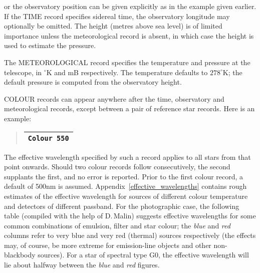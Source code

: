 \documentclass[twoside,11pt]{article}
\renewcommand{\_}{\texttt{\symbol{95}}}
\begin{document}
or the observatory position can be given explicitly as in the example
given earlier.  If the TIME record specifies sidereal time, the
observatory longitude may optionally be omitted.  The height (metres above
sea level) is of limited importance unless the meteorological record is
absent, in which case the height is used to estimate the pressure.

The METEOROLOGICAL record specifies the temperature and pressure at the
telescope, in $^\circ$K and mB respectively.  The temperature defaults
to $278^\circ$K; the default pressure is computed from the observatory
height.

COLOUR records can appear anywhere after the time, observatory and
meteorological records, except between a pair of reference star records.
Here is an example:

\begin{quote}
\begin{tabular}{|l|}
\hline
\verb|Colour 550| \\
\hline
\end{tabular}
\end{quote}

The effective wavelength specified by such a record applies to all
stars from that point onwards.  Should two colour records follow
consecutively, the second supplants the first, and no error is reported.
Prior to the first colour record, a default of 500nm is assumed.
Appendix~\ref{effective_wavelengths} contains rough estimates of the
effective wavelength for sources of different colour temperature and
detectors of different passband.  For the photographic case, the following
table (compiled with the help of D.\,Malin) suggests effective wavelengths
for some common combinations of emulsion, filter and star colour;
the \textit{blue} and \textit{red} columns refer to very blue and
very red (thermal) sources respectively (the effects may, of course, be
more extreme for emission-line objects and other non-blackbody sources).
For a star of spectral type G0, the effective wavelength will lie about
halfway between the \textit{blue} and \textit{red} figures.
\end{document}
